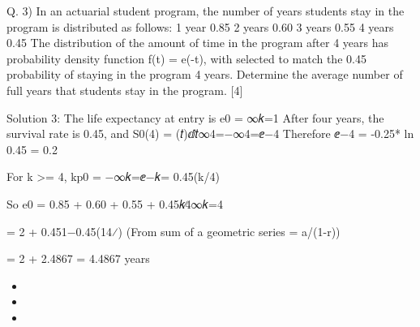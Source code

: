 \documentclass[a4paper,12pt]{article}
\begin{document}


Q. 3)
In an actuarial student program, the number of years students stay in the program is distributed as follows:
1 year 0.85
2 years 0.60
3 years 0.55
4 years 0.45
The distribution of the amount of time in the program after 4 years has probability density function f(t) = \mu*e(-\mu*t), with \mu selected to match the 0.45 probability of staying in the program 4 years.
Determine the average number of full years that students stay in the program.
[4]


Solution 3:
The life expectancy at entry is e0 = ∞𝑘=1 
After four years, the survival rate is 0.45, and
S0(4) = (𝑡)ⅆ𝑡∞4=\int{}−∞4=ⅇ−4\mu
Therefore ⅇ−4
\mu = -0.25* ln 0.45 = 0.2

For k >= 4,
kp0 = \int{}−∞𝑘=ⅇ−𝑘\mu = 0.45(k/4)

So e0 = 0.85 + 0.60 + 0.55 + \Sum0.45𝑘∕4∞𝑘=4

= 2 + 0.451−0.45(14⁄) (From sum of a geometric series = a/(1-r))

= 2 + 2.4867
= 4.4867 years 

\begin{itemize}
\item 
\item 
\item 
\end{itemize}
\end{document}
